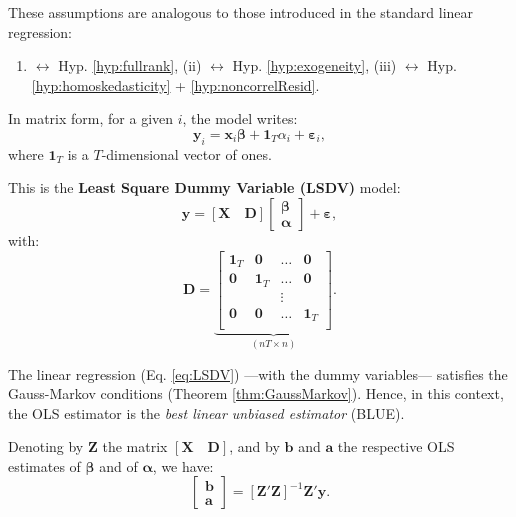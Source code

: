 \documentclass[
  12pt,
]{book}
\providecommand{\tightlist}{%
  \setlength{\itemsep}{0pt}\setlength{\parskip}{0pt}}
\theoremstyle{definition}
\theoremstyle{definition}
\theoremstyle{definition}
\theoremstyle{definition}
\theoremstyle{remark}
\begin{document}
These assumptions are analogous to those introduced in the standard linear regression:

\begin{enumerate}
\def\labelenumi{(\roman{enumi})}
\tightlist
\item
  \(\leftrightarrow\) Hyp. \ref{hyp:fullrank}, (ii) \(\leftrightarrow\) Hyp. \ref{hyp:exogeneity}, (iii) \(\leftrightarrow\) Hyp. \ref{hyp:homoskedasticity} + \ref{hyp:noncorrelResid}.
\end{enumerate}

In matrix form, for a given \(i\), the model writes:
\[
\mathbf{y}_i = \mathbf{x}_i \boldsymbol\beta + \mathbf{1}_T\alpha_i + \boldsymbol\varepsilon_i,
\]
where \(\mathbf{1}_T\) is a \(T\)-dimensional vector of ones.

This is the \textbf{Least Square Dummy Variable (LSDV)} model:
\begin{equation}
\mathbf{y} = [\mathbf{X} \quad \mathbf{D}]
\left[
\begin{array}{c}
\boldsymbol\beta\\
\boldsymbol\alpha
\end{array}
\right]
+ \boldsymbol\varepsilon, \label{eq:LSDV}
\end{equation}
with:
\[
\mathbf{D} = \underbrace{ \left[\begin{array}{cccc}
\mathbf{1}_T&\mathbf{0}&\dots&\mathbf{0}\\
\mathbf{0}&\mathbf{1}_T&\dots&\mathbf{0}\\
&&\vdots&\\
\mathbf{0}&\mathbf{0}&\dots&\mathbf{1}_T\\
\end{array}\right]}_{(nT \times n)}.
\]

The linear regression (Eq. \eqref{eq:LSDV}) ---with the dummy variables--- satisfies the Gauss-Markov conditions (Theorem \ref{thm:GaussMarkov}). Hence, in this context, the OLS estimator is the \emph{best linear unbiased estimator} (BLUE).

Denoting by \(\mathbf{Z}\) the matrix \([\mathbf{X} \quad \mathbf{D}]\), and by \(\mathbf{b}\) and \(\mathbf{a}\) the respective OLS estimates of \(\boldsymbol\beta\) and of \(\boldsymbol\alpha\), we have:
\begin{equation}
\boxed{
\left[
\begin{array}{c}
\mathbf{b}\\
\mathbf{a}
\end{array}
\right]
= [\mathbf{Z}'\mathbf{Z}]^{-1}\mathbf{Z}'\mathbf{y}.} \label{eq:bfixedeffects11}
\end{equation}
\end{document}
